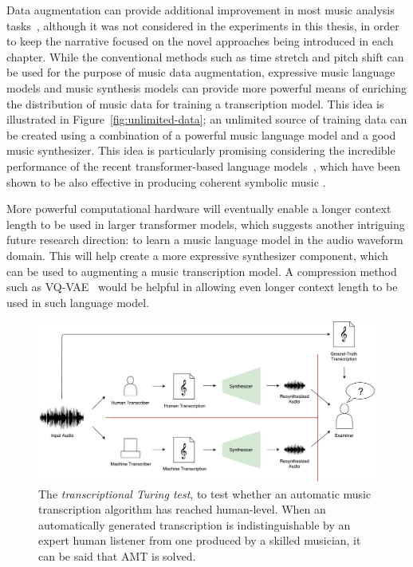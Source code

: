 Data augmentation can provide additional improvement in most music analysis tasks~\cite{mcfee2015muda}, although it was not considered in the experiments in this thesis, in order to keep the narrative focused on the novel approaches being introduced in each chapter.
While the conventional methods such as time stretch and pitch shift can be used for the purpose of music data augmentation, expressive music language models and music synthesis models can provide more powerful means of enriching the distribution of music data for training a transcription model.
This idea is illustrated in Figure~\ref{fig:unlimited-data}; an unlimited source of training data can be created using a combination of a powerful music language model and a good music synthesizer.
This idea is particularly promising considering the incredible performance of the recent transformer-based language models~\cite{vaswani2017attention}, which have been shown to be also effective in producing coherent symbolic music \cite{huang2019transformer}.

More powerful computational hardware will eventually enable a longer context length to be used in larger transformer models, which suggests another intriguing future research direction: to learn a music language model in the audio waveform domain.
This will help create a more expressive synthesizer component, which can be used to augmenting a music transcription model.
A compression method such as VQ-VAE~\cite{oord2017vqvae} would be helpful in allowing even longer context length to be used in such language model.

\begin{figure}[b!]
	\includegraphics[width=\textwidth]{turing.pdf}
	\caption{The \emph{transcriptional Turing test}, to test whether an automatic music transcription algorithm has reached human-level. When an automatically generated transcription is indistinguishable by an expert human listener from one produced by a skilled musician, it can be said that AMT is solved.}
	\label{fig:turing}
\end{figure}


